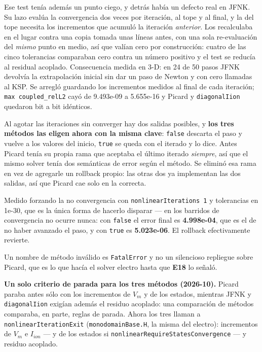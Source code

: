 \documentclass[11pt,a4paper]{article}
\begin{document}
Ese test tenía además un punto ciego, y detrás había un defecto real en JFNK. Su
lazo evalúa la convergencia dos veces por iteración, al tope y al final, y la del
tope necesita los incrementos que acumuló la iteración \emph{anterior}. Los
recalculaba en el lugar contra una copia tomada unas líneas antes, con una sola
re-evaluación del \emph{mismo} punto en medio, así que valían cero por
construcción: cuatro de las cinco tolerancias comparaban cero contra un número
positivo y el test se reducía al residual acoplado. Consecuencia medida en 3-D:
en 24 de 50 pasos JFNK devolvía la extrapolación inicial sin dar un paso de
Newton y con cero llamadas al KSP. Se arregló guardando los incrementos medidos
al final de cada iteración; \texttt{max coupled\_relL2} cayó de 9.493e-09 a
5.655e-16 y Picard y \texttt{diagonalIion} quedaron bit a bit idénticos.

Al agotar las iteraciones sin converger hay dos salidas posibles, y \textbf{los
tres métodos las eligen ahora con la misma clave}: \texttt{false} descarta el
paso y vuelve a los valores del inicio, \texttt{true} se queda con el iterado y
lo dice. Antes Picard tenía su propia rama que aceptaba el último iterado
\emph{siempre}, así que el mismo solver tenía dos semánticas de error según el
método. Se eliminó esa rama en vez de agregarle un rollback propio: las otras
dos ya implementan las dos salidas, así que Picard cae solo en la correcta.

Medido forzando la no convergencia con \texttt{nonlinearIterations 1} y
tolerancias en 1e-30, que es la única forma de hacerlo disparar --- en los
barridos de convergencia no ocurre nunca: con \texttt{false} el error final es
\textbf{4.998e-04}, que es el de no haber avanzado el paso, y con \texttt{true}
es \textbf{5.023e-06}. El rollback efectivamente revierte.

Un nombre de método inválido es \texttt{FatalError} y no un silencioso repliegue
sobre Picard, que es lo que hacía el solver electro hasta que \textbf{E18} lo
señaló.

\textbf{Un solo criterio de parada para los tres métodos (2026-10).} Picard
paraba antes sólo con los incrementos de $V_m$ y de los estados, mientras JFNK y
\texttt{diagonalIion} exigían además el residuo acoplado: una comparación de
métodos comparaba, en parte, reglas de parada. Ahora los tres llaman a
\texttt{nonlinearIterationExit} (\texttt{monodomainBase.H}, la misma del
electro): incrementos de $V_m$ e $I_{ion}$ --- y de los estados si
\texttt{nonlinearRequireStatesConvergence} --- y residuo acoplado.
\end{document}
